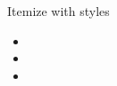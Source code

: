 \documentclass{beamer}
\begin{document}
    \begin{frame}{Itemize with styles}
        \begin{itemize}[<alert@+>]
            \item {}
            \item {}
            \item {}
        \end{itemize}
    \end{frame}
\end{document}
